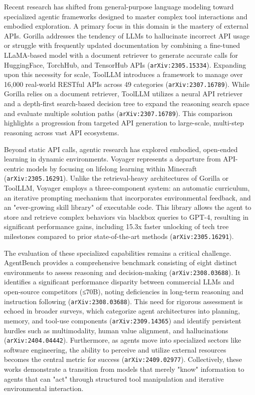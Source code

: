 \documentclass[11pt]{article}
\begin{document}
Recent research has shifted from general-purpose language modeling toward specialized agentic frameworks designed to master complex tool interactions and embodied exploration. A primary focus in this domain is the mastery of external APIs. Gorilla addresses the tendency of LLMs to hallucinate incorrect API usage or struggle with frequently updated documentation by combining a fine-tuned LLaMA-based model with a document retriever to generate accurate calls for HuggingFace, TorchHub, and TensorHub APIs (\texttt{arXiv:2305.15334}). Expanding upon this necessity for scale, ToolLLM introduces a framework to manage over 16,000 real-world RESTful APIs across 49 categories (\texttt{arXiv:2307.16789}). While Gorilla relies on a document retriever, ToolLLM utilizes a neural API retriever and a depth-first search-based decision tree to expand the reasoning search space and evaluate multiple solution paths (\texttt{arXiv:2307.16789}). This comparison highlights a progression from targeted API generation to large-scale, multi-step reasoning across vast API ecosystems.

Beyond static API calls, agentic research has explored embodied, open-ended learning in dynamic environments. Voyager represents a departure from API-centric models by focusing on lifelong learning within Minecraft (\texttt{arXiv:2305.16291}). Unlike the retrieval-heavy architectures of Gorilla or ToolLLM, Voyager employs a three-component system: an automatic curriculum, an iterative prompting mechanism that incorporates environmental feedback, and an "ever-growing skill library" of executable code. This library allows the agent to store and retrieve complex behaviors via blackbox queries to GPT-4, resulting in significant performance gains, including 15.3x faster unlocking of tech tree milestones compared to prior state-of-the-art methods (\texttt{arXiv:2305.16291}).

The evaluation of these specialized capabilities remains a critical challenge. AgentBench provides a comprehensive benchmark consisting of eight distinct environments to assess reasoning and decision-making (\texttt{arXiv:2308.03688}). It identifies a significant performance disparity between commercial LLMs and open-source competitors (≤70B), noting deficiencies in long-term reasoning and instruction following (\texttt{arXiv:2308.03688}). This need for rigorous assessment is echoed in broader surveys, which categorize agent architectures into planning, memory, and tool-use components (\texttt{arXiv:2309.14365}) and identify persistent hurdles such as multimodality, human value alignment, and hallucinations (\texttt{arXiv:2404.04442}). Furthermore, as agents move into specialized sectors like software engineering, the ability to perceive and utilize external resources becomes the central metric for success (\texttt{arXiv:2409.02977}). Collectively, these works demonstrate a transition from models that merely "know" information to agents that can "act" through structured tool manipulation and iterative environmental interaction.
\end{document}

